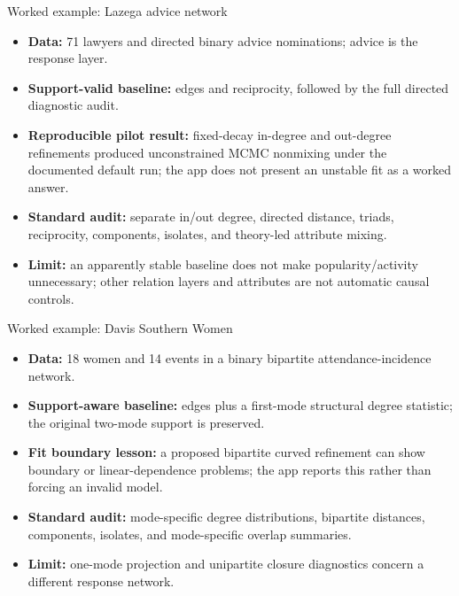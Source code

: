 \documentclass[aspectratio=169,11pt]{beamer}
\newcommand{\term}[1]{\textbf{\color{nupurple}#1}}
\begin{document}
\begin{frame}{Worked example: Lazega advice network}
\begin{itemize}
\item \term{Data:} 71 lawyers and directed binary advice nominations; advice is the response layer.
\item \term{Support-valid baseline:} edges and reciprocity, followed by the full directed diagnostic audit.
\item \term{Reproducible pilot result:} fixed-decay in-degree and out-degree refinements produced unconstrained MCMC nonmixing under the documented default run; the app does not present an unstable fit as a worked answer.
\item \term{Standard audit:} separate in/out degree, directed distance, triads, reciprocity, components, isolates, and theory-led attribute mixing.
\item \term{Limit:} an apparently stable baseline does not make popularity/activity unnecessary; other relation layers and attributes are not automatic causal controls.
\end{itemize}
\end{frame}

\begin{frame}{Worked example: Davis Southern Women}
\begin{itemize}
\item \term{Data:} 18 women and 14 events in a binary bipartite attendance-incidence network.
\item \term{Support-aware baseline:} edges plus a first-mode structural degree statistic; the original two-mode support is preserved.
\item \term{Fit boundary lesson:} a proposed bipartite curved refinement can show boundary or linear-dependence problems; the app reports this rather than forcing an invalid model.
\item \term{Standard audit:} mode-specific degree distributions, bipartite distances, components, isolates, and mode-specific overlap summaries.
\item \term{Limit:} one-mode projection and unipartite closure diagnostics concern a different response network.
\end{itemize}
\end{frame}
\end{document}
